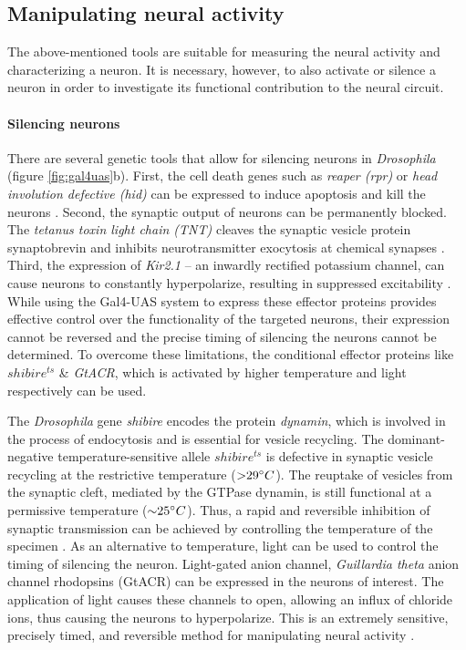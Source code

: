 \subsection{Manipulating neural activity}

The above-mentioned tools are suitable for measuring the neural activity and characterizing a neuron. It is necessary, however, to also activate or silence a neuron in order to investigate its functional contribution to the neural circuit. 

\paragraph{Silencing neurons}
There are several genetic tools that allow for silencing neurons in \textit{Drosophila} (figure \ref{fig:gal4uas}b). First, the cell death genes such as \textit{reaper (rpr)} or \textit{head involution defective (hid)} can be expressed to induce apoptosis and kill the neurons \parencite{Chen1996, Grether1995}. Second, the synaptic output of neurons can be permanently blocked. The \textit{tetanus toxin light chain (TNT)} cleaves the synaptic vesicle protein synaptobrevin and inhibits neurotransmitter exocytosis at chemical synapses \parencite{Sweeney1995}. Third, the expression of \textit{Kir2.1} -- an inwardly rectified potassium channel, can cause neurons to constantly hyperpolarize, resulting in suppressed excitability \parencite{Johns1999}. While using the Gal4-UAS system to express these effector proteins provides effective control over the functionality of the targeted neurons, their expression cannot be reversed and the precise timing of silencing the neurons cannot be determined. To overcome these limitations, the conditional effector proteins like \textit{$shibire^{ts}$} \& \textit{GtACR}, which is activated by higher temperature and light respectively can be used. 

The \textit{Drosophila} gene \textit{shibire} encodes the protein \textit{dynamin}, which is involved in the process of endocytosis and is essential for vesicle recycling. The dominant-negative temperature-sensitive allele $shibire^{ts}$ is defective in synaptic vesicle recycling at the restrictive temperature (${>}29\degree C$). The reuptake of vesicles from the synaptic cleft, mediated by the GTPase dynamin, is still functional at a permissive temperature (${\sim}25\degree C$). Thus, a rapid and reversible inhibition of synaptic transmission can be achieved by controlling the temperature of the specimen \parencite{Kitamoto2001}. As an alternative to temperature, light can be used to control the timing of silencing the neuron. Light-gated anion channel, \textit{Guillardia theta} anion channel rhodopsins (GtACR) can be expressed in the neurons of interest. The application of light causes these channels to open, allowing an influx of chloride ions, thus causing the neurons to hyperpolarize. This is an extremely sensitive, precisely timed, and reversible method for manipulating neural activity \parencite{Govorunova2015, Mauss2017, Mohammad2017}.


